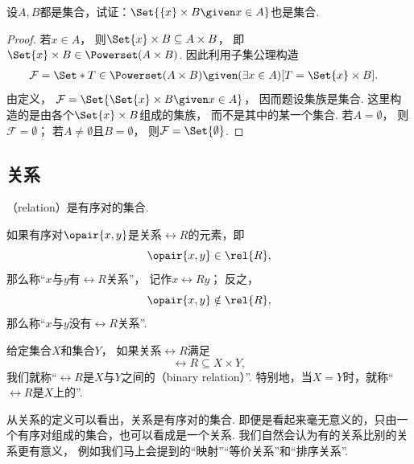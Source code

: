 \begin{example}
    设\(A,B\)都是集合，试证：\(\Set{ \{x\} \times B \given x \in A }\)也是集合.
    \begin{proof}
        若\(x\in A\)，
        则\(\Set{x}\times B\subseteq A\times B\)，
        即\(\Set{x}\times B\in\Powerset(A\times B)\).
        因此利用子集公理构造
        \begin{align*}
            \mathcal{F}
            &= \Set*{T\in\Powerset(A\times B)
            \given(\exists x\in A)[T=\Set{x}\times B]}.
        \end{align*}
        由定义，
        \(\mathcal{F}=\Set{\Set{x}\times B\given x\in A}\)，
        因而题设集族是集合.
        这里构造的是由各个\(\Set{x}\times B\)组成的集族，
        而不是其中的某一个集合.
        若\(A=\emptyset\)，
        则\(\mathcal{F}=\emptyset\)；
        若\(A\neq\emptyset\)且\(B=\emptyset\)，
        则\(\mathcal{F}=\Set{\emptyset}\).
    \end{proof}
\end{example}

\subsection{关系}
\begin{definition}
    （relation）是有序对的集合.
\end{definition}

如果有序对\(\opair{x,y}\)是关系\(\rel{R}\)的元素，即
\begin{equation*}
    \opair{x,y} \in \rel{R},
\end{equation*}
那么称“\(x\)与\(y\)有\(\rel{R}\)关系”，
记作\(x\rel{R}y\)；
反之，
\begin{equation*}
    \opair{x,y} \notin \rel{R},
\end{equation*}
那么称“\(x\)与\(y\)没有\(\rel{R}\)关系”.

给定集合\(X\)和集合\(Y\)，
如果关系\(\rel{R}\)满足
\begin{equation*}
    \rel{R} \subseteq X \times Y,
\end{equation*}
我们就称“\(\rel{R}\)是\(X\)与\(Y\)之间的（binary relation）”.
特别地，当\(X = Y\)时，就称“\(\rel{R}\)是\(X\)上的”.

从关系的定义可以看出，关系是有序对的集合.
即便是看起来毫无意义的，只由一个有序对组成的集合，也可以看成是一个关系.
我们自然会认为有的关系比别的关系更有意义，
例如我们马上会提到的“映射”“等价关系”和“排序关系”.

